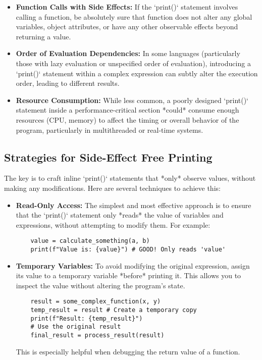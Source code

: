 \documentclass{article}
\begin{document}
{{{{\begin{itemize}
    \item \textbf{Function Calls with Side Effects:} If the `print()` statement involves calling a function, be absolutely sure that function does not alter any global variables, object attributes, or have any other observable effects beyond returning a value.

    \item \textbf{Order of Evaluation Dependencies:} In some languages (particularly those with lazy evaluation or unspecified order of evaluation), introducing a `print()` statement within a complex expression can subtly alter the execution order, leading to different results.

    \item \textbf{Resource Consumption:} While less common, a poorly designed `print()` statement inside a performance-critical section *could* consume enough resources (CPU, memory) to affect the timing or overall behavior of the program, particularly in multithreaded or real-time systems.
\end{itemize}

\subsection*{Strategies for Side-Effect Free Printing}

The key is to craft inline `print()` statements that *only* observe values, without making any modifications. Here are several techniques to achieve this:

\begin{itemize}
    \item \textbf{Read-Only Access:} The simplest and most effective approach is to ensure that the `print()` statement only *reads* the value of variables and expressions, without attempting to modify them.  For example:
    \begin{verbatim}
    value = calculate_something(a, b)
    print(f"Value is: {value}") # GOOD! Only reads 'value'
    \end{verbatim}

    \item \textbf{Temporary Variables:} To avoid modifying the original expression, assign its value to a temporary variable *before* printing it. This allows you to inspect the value without altering the program's state.
    \begin{verbatim}
    result = some_complex_function(x, y)
    temp_result = result # Create a temporary copy
    print(f"Result: {temp_result}")
    # Use the original result
    final_result = process_result(result)
    \end{verbatim}
    This is especially helpful when debugging the return value of a function.


\end{itemize}}}}}
\end{document}
